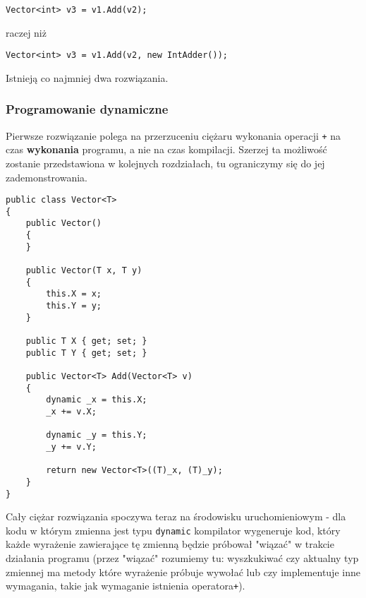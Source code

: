 \begin{scriptsize}
\begin{verbatim}
Vector<int> v3 = v1.Add(v2);
\end{verbatim}
\end{scriptsize}

raczej niż

\begin{scriptsize}
\begin{verbatim}
Vector<int> v3 = v1.Add(v2, new IntAdder());
\end{verbatim}
\end{scriptsize}

Istnieją co najmniej dwa rozwiązania. 

\subsubsection{Programowanie dynamiczne}

Pierwsze rozwiązanie polega na przerzuceniu ciężaru wykonania operacji {\tt +} na czas {\bf wykonania} programu, a nie na 
czas kompilacji. Szerzej ta możliwość zostanie przedstawiona w kolejnych rozdziałach, tu ograniczymy się do jej zademonstrowania.

\begin{scriptsize}
\begin{verbatim}
public class Vector<T>
{
    public Vector()
    {
    }

    public Vector(T x, T y)
    {
        this.X = x;
        this.Y = y;
    }

    public T X { get; set; }
    public T Y { get; set; }

    public Vector<T> Add(Vector<T> v)
    {
        dynamic _x = this.X;
        _x += v.X;

        dynamic _y = this.Y;
        _y += v.Y;

        return new Vector<T>((T)_x, (T)_y);
    }
}
\end{verbatim}
\end{scriptsize}

Cały ciężar rozwiązania spoczywa teraz na środowisku uruchomieniowym - dla kodu w którym zmienna jest typu 
{\tt dynamic} kompilator wygeneruje kod, który każde wyrażenie zawierające tę zmienną będzie próbował "wiązać"
w trakcie działania programu (przez "wiązać" rozumiemy tu: wyszkukiwać czy aktualny typ zmiennej ma metody
które wyrażenie próbuje wywołać lub czy implementuje inne wymagania, takie jak wymaganie istnienia operatora{\tt +}).


